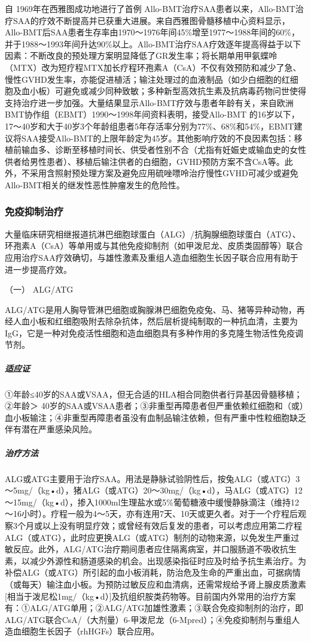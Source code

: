自 1969年在西雅图成功地进行了首例
Allo-BMT治疗SAA患者以来，Allo-BMT治疗SAA的疗效不断提高并已获重大进展。来自西雅图骨髓移植中心资料显示，Allo-BMT后SAA患者生存率由1970～1976年间45\%增至1977～1988年间的60\%，并于1988～1993年间升达90\%以上。Allo-BMT治疗SAA疗效逐年提高得益于以下因素：不断改良的预处理方案明显降低了GR发生率；将长期单用甲氨蝶呤（MTX）改为短疗程MTX加长疗程环孢素A（CsA）不仅有效预防和减少了急、慢性GVHD发生率，亦能促进植活；输注处理过的血液制品（如少白细胞的红细胞及血小板）可避免或减少同种致敏；多种新型高效抗生素及抗病毒药物问世使得支持治疗进一步加强。大量结果显示Allo-BMT疗效与患者年龄有关，来自欧洲BMT协作组（EBMT）1990～1998年间资料表明，接受Allo-BMT
的16岁以下，17～40岁和大于40岁3个年龄组患者5年存活率分别为77\%、68\%和54\%，EBMT建议将SAA接受Allo-BMT的上限年龄定为45岁。其他影响疗效的不良因素包括：移植前输血多、诊断至移植时间长、供受者性别不合（尤指有妊娠史或输血史的女性供者给男性患者）、移植后输注供者的白细胞，GVHD预防方案不含CsA等。此外，不采用含照射预处理方案及避免应用硫唑嘌呤治疗慢性GVHD可减少或避免Allo-BMT相关的继发性恶性肿瘤发生的危险性。

\subsubsection{免疫抑制治疗}

大量临床研究相继报道抗淋巴细胞球蛋白（ALG）/抗胸腺细胞球蛋白（ATG）、环孢素A（CsA）等单用或与其他免疫抑制剂（如甲泼尼龙、皮质类固醇等）联合应用治疗SAA疗效确切，与雄性激素及重组人造血细胞生长因子联合应用有助于进一步提高疗效。

\hypertarget{text00089.htmlux5cux23CHP3-10-1-3-3-1}{}
（一） ALG/ATG

ALG/ATG是用人胸导管淋巴细胞或胸腺淋巴细胞免疫兔、马、猪等异种动物，再经人血小板和红细胞吸附去除杂抗体，然后层析提纯制取的一种抗血清，主要为IgG，它是一种对免疫活性细胞和造血细胞具有多种作用的多克隆生物活性免疫调节剂。

\subparagraph{适应证}

①年龄≤40岁的SAA或VSAA，但无合适的HLA相合同胞供者行异基因骨髓移植；②年龄＞
40岁的SAA或VSAA患者；③非重型再障患者但严重依赖红细胞和（或）血小板输注；④非重型再障患者虽没有血制品输注依赖，但有严重中性粒细胞缺乏伴有潜在严重感染风险。

\subparagraph{治疗方法}

ALG或ATG主要用于治疗SAA。用法是静脉试验阴性后，按兔ALG（或ATG）3～5mg/（kg•d），猪ALG（或ATG）20～30mg/（kg•d），马ALG（或ATG）12～15mg/（kg•d），掺入1000ml生理盐水或5\%葡萄糖液中缓慢静脉滴注（维持12～16小时）。疗程一般为4～5天，亦有连用7天、10天或更久者。对于一个疗程后观察3个月或以上没有明显疗效；或曾经有效后复发的患者，可以考虑应用第二疗程ALG（或ATG），此时应更换ALG（或ATG）制剂的动物来源，以免发生严重过敏反应。此外，ALG/ATG治疗期间患者应住隔离病室，并口服肠道不吸收抗生素，以减少外源性和肠道感染的机会。出现感染指征时应及时给予抗生素治疗。为补偿ALG（或ATG）所引起的血小板消耗，防治危及生命的严重出血，可据病情（或每天）输注血小板。为预防过敏反应和血清病，还需常规给予肾上腺皮质激素{[}相当于泼尼松1mg/（kg•d）{]}及抗组织胺类药物等。目前国内外常用的治疗方案有：①ALG/ATG单用；②ALG/ATG加雄性激素；③联合免疫抑制剂的治疗，即ALG/ATG联合CsA/（大剂量）6-甲泼尼龙（6-Mpred）；④免疫抑制剂与重组人造血细胞生长因子（rhHGFs）联合应用。

